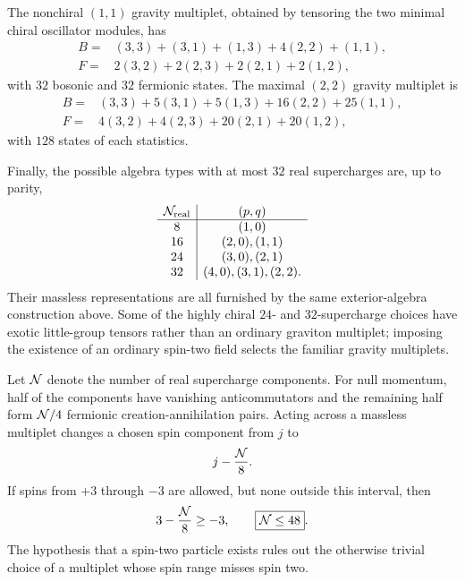 \begin{enumerate}
  The nonchiral \((1,1)\) gravity multiplet, obtained by tensoring the
  two minimal chiral oscillator modules, has
  \[
  \begin{split}
    B={}&(3,3)+(3,1)+(1,3)+4(2,2)+(1,1),\\
    F={}&2(3,2)+2(2,3)+2(2,1)+2(1,2),
  \end{split}
  \]
  with \(32\) bosonic and \(32\) fermionic states.  The maximal
  \((2,2)\) gravity multiplet is
  \[
  \begin{split}
    B={}&(3,3)+5(3,1)+5(1,3)+16(2,2)+25(1,1),\\
    F={}&4(3,2)+4(2,3)+20(2,1)+20(1,2),
  \end{split}
  \]
  with \(128\) states of each statistics.

  Finally, the possible algebra types with at most \(32\) real
  supercharges are, up to parity,
  \[
  \begin{array}{c|c}
    {\cal N}_{\rm real}&(p,q)\\ \hline
     8&(1,0)\\
    16&(2,0),(1,1)\\
    24&(3,0),(2,1)\\
    32&(4,0),(3,1),(2,2).
  \end{array}
  \]
  Their massless representations are all furnished by the same
  exterior-algebra construction above.  Some of the highly chiral
  \(24\)- and \(32\)-supercharge choices have exotic little-group
  tensors rather than an ordinary graviton multiplet; imposing the
  existence of an ordinary spin-two field selects the familiar
  gravity multiplets.

  Let \({\cal N}\) denote the number of real supercharge components.
  For null momentum, half of the components have vanishing
  anticommutators and the remaining half form
  \({\cal N}/4\) fermionic creation-annihilation pairs.  Acting across a
  massless multiplet changes a chosen spin component from \(j\) to
  \[
    j-\frac{{\cal N}}{8}.
  \]
  If spins from \(+3\) through \(-3\) are allowed, but none outside
  this interval, then
  \[
    3-\frac{{\cal N}}8\geq-3,\qquad
    \boxed{{\cal N}\leq48}.
  \]
  The hypothesis that a spin-two particle exists rules out the
  otherwise trivial choice of a multiplet whose spin range misses
  spin two.


\end{enumerate}
